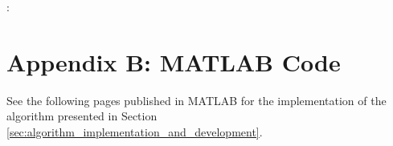 \documentclass[fleqn,10pt]{../SelfArx} %
\begin{document}
\noindent \texttt{\textbf{}}: 
\vskip 0.3cm





\section*{Appendix B: MATLAB Code}
See the following pages published in MATLAB for the implementation of the algorithm presented in Section \ref{sec:algorithm_implementation_and_development}.




% 
% 

\end{document}
